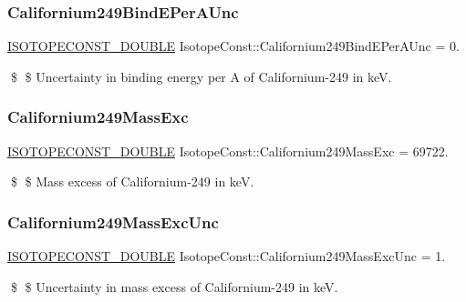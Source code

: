 \subsubsection{\texorpdfstring{Californium249\+Bind\+E\+Per\+A\+Unc}{Californium249BindEPerAUnc}}
{\footnotesize\ttfamily \mbox{\hyperlink{group___isotope_const-_macros_ga8f45a7272ce02c0b4c65c44636ed719a}{I\+S\+O\+T\+O\+P\+E\+C\+O\+N\+S\+T\+\_\+\+D\+O\+U\+B\+LE}} Isotope\+Const\+::\+Californium249\+Bind\+E\+Per\+A\+Unc = 0.}

\$ \$ Uncertainty in binding energy per A of Californium-\/249 in keV. \mbox{\label{group___isotope_const-_californium-_cf249_gad29bda6d91e6079283a8fc2c3632b5a1}} 
\subsubsection{\texorpdfstring{Californium249\+Mass\+Exc}{Californium249MassExc}}
{\footnotesize\ttfamily \mbox{\hyperlink{group___isotope_const-_macros_ga8f45a7272ce02c0b4c65c44636ed719a}{I\+S\+O\+T\+O\+P\+E\+C\+O\+N\+S\+T\+\_\+\+D\+O\+U\+B\+LE}} Isotope\+Const\+::\+Californium249\+Mass\+Exc = 69722.}

\$ \$ Mass excess of Californium-\/249 in keV. \mbox{\label{group___isotope_const-_californium-_cf249_gad661e71a37907f57a0f86ba9ce79ab3e}} 
\subsubsection{\texorpdfstring{Californium249\+Mass\+Exc\+Unc}{Californium249MassExcUnc}}
{\footnotesize\ttfamily \mbox{\hyperlink{group___isotope_const-_macros_ga8f45a7272ce02c0b4c65c44636ed719a}{I\+S\+O\+T\+O\+P\+E\+C\+O\+N\+S\+T\+\_\+\+D\+O\+U\+B\+LE}} Isotope\+Const\+::\+Californium249\+Mass\+Exc\+Unc = 1.}

\$ \$ Uncertainty in mass excess of Californium-\/249 in keV. \mbox{\label{group___isotope_const-_californium-_cf249_ga93151d589e42926803211b4bcd5ed2f2}} 
